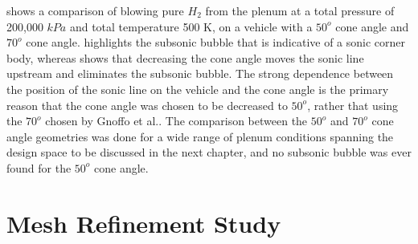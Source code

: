  shows a comparison of blowing pure $H_2$ from the
plenum at a total pressure of 200,000 $kPa$ and total temperature 500 K, on a
vehicle with a $50^o$ cone angle and $70^o$ cone angle.  
highlights the subsonic bubble that is indicative of a sonic corner body,
whereas  shows that decreasing the cone angle moves the
sonic line upstream and eliminates the subsonic bubble.  The strong dependence
between the position of the sonic line on the vehicle and the cone angle is the
primary reason that the cone angle was chosen to be decreased to $50^o$, rather
that using the $70^o$ chosen by Gnoffo et al.\cite{gnoffo2016tapping}.  The
comparison between the $50^o$ and $70^o$ cone angle geometries was done for a
wide range of plenum conditions spanning the design space to be discussed in the
next chapter, and no subsonic bubble was ever found for the $50^o$ cone angle.

\section{Mesh Refinement Study}
\label{sec:mesh-refinement-study}

